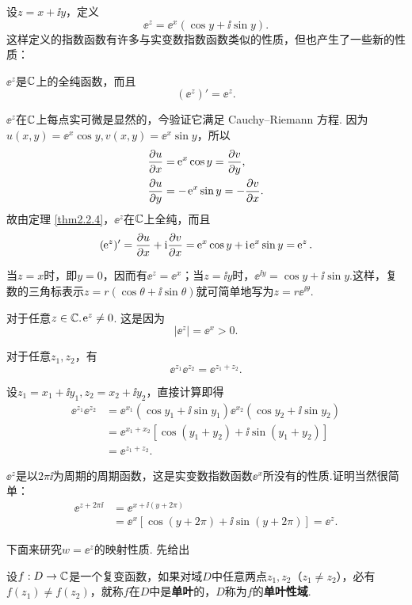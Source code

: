 设$z=x+\ii y$，定义
\[
  \ee^z = \ee^x(\cos y + \ii \sin y).
\]
这样定义的指数函数有许多与实变数指数函数类似的性质，但也产生了一些新的性质：
\begin{eenum}\ccwd
  \item $\ee^z$是$\mathbb C$上的全纯函数，而且
    \[
      (\ee^z)' = \ee^z.
    \]

    $\ee^z$在$\mathbb C$上每点实可微是显然的，今验证它满足 Cauchy--Riemann 方程. 因为$u(x,y)=\ee^x\cos y,v(x,y)=\ee^x\sin y$，所以
    \begin{align*}
      & \frac{\partial u}{\partial x} = \operatorname{\!\!\;\mathrm e}^x\cos y = \frac{\partial v}{\partial y},\\
      &\frac{\partial u}{\partial y} = -\operatorname{\!\!\;\mathrm e}^x\sin y = -\frac{\partial v}{\partial x}.
    \end{align*}
    故由定理 \ref{thm2.2.4}，$\ee^z$在$\mathbb C$上全纯，而且
    \[
      (\ee^z)' = \pp ux + \ii \pp vx = \ee^x\cos y + \ii \ee^x\sin y = \ee^z.
    \]

  \item 当$z=x$时，即$y=0$，因而有$\ee^z=\ee^x$；当$z=\ii y$时，$\ee^{\ii y}=\cos y+\ii\sin y$.这样，复数的三角标表示$z=r(\cos\theta+\ii\sin\theta)$就可简单地写为$z=r\ee^{\ii\theta}$.

  \item 对于任意$z\in \mathbb C.\operatorname{\!\!\;\mathrm e}^z\ne0$. 这是因为
      \[
        |\ee^z| = \ee^x > 0.
      \]

  \item 对于任意$z_1,z_2$，有
      \[
        \ee^{z_1} \ee^{z_2} = \ee^{z_1 + z_2}.
      \]

      设$z_1=x_1+\ii y_1,z_2=x_2+\ii y_2$，直接计算即得
      \begin{align*}
        \ee^{z_1} \ee^{z_2} & = \ee^{x_1}(\cos y_1 + \ii\sin y_1) \ee^{x_2}(\cos y_2 + \ii \sin y_2)\\
        & = \ee^{x_1 + x_2}[\cos(y_1+y_2) + \ii\sin(y_1+y_2)]\\
        & = \ee^{z_1+z_2}.
      \end{align*}

  \item $\ee^z$是以$2\pi\ii$为周期的周期函数，这是实变数指数函数$\ee^x$所没有的性质.证明当然很简单：
      \begin{align*}
        \ee^{z + 2\pi\ii} & = \ee^{x + \ii(y + 2\pi)}\\
        & = \ee^x[\cos(y + 2\pi) + \ii\sin(y + 2\pi)] = \ee^z.
      \end{align*}
\end{eenum}

下面来研究$w=\ee^z$的映射性质. 先给出
\begin{definition}\label{def2.4.1}
  设$f:D\to\mathbb C$是一个复变函数，如果对域$D$中任意两点$z_1,z_2$（$z_1\ne z_2$），必有$f(z_1)\ne f(z_2)$，就称$f$在$D$中是\textbf{单叶}的，$D$称为$f$的\textbf{单叶性域}.
\end{definition}

